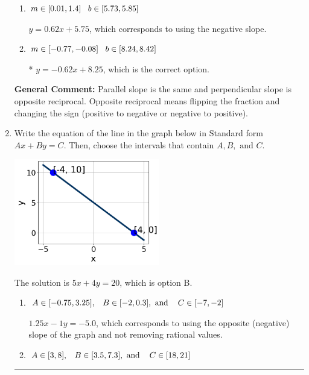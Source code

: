 \documentclass{extbook}[14pt]
\newcommand{\litem}[1]{\item #1

\rule{\textwidth}{0.4pt}}
\begin{document}
\begin{enumerate}
{\begin{enumerate}[label=\Alph*.]
 $y = -0.62x - 8.25$, which corresponds to using the correct slope and getting the negative $y$-intercept.
\item \( m \in [0.01, 1.4] \hspace*{3mm} b \in [5.73, 5.85] \)

 $y = 0.62x + 5.75$, which corresponds to using the negative slope.
\item \( m \in [-0.77, -0.08] \hspace*{3mm} b \in [8.24, 8.42] \)

* $y = -0.62x + 8.25$, which is the correct option.
\end{enumerate}

\textbf{General Comment:} Parallel slope is the same and perpendicular slope is opposite reciprocal. Opposite reciprocal means flipping the fraction and changing the sign (positive to negative or negative to positive).
}
\litem{
Write the equation of the line in the graph below in Standard form $Ax+By=C$. Then, choose the intervals that contain $A, B, \text{ and } C$.

\begin{center}
    \includegraphics[width=0.5\textwidth]{../Figures/linearGraphToStandardA.png}
\end{center}




The solution is \( 5x + 4y = 20 \), which is option B.\begin{enumerate}[label=\Alph*.]
\item \( A \in [-0.75, 3.25], \hspace{3mm} B \in [-2, 0.3], \text{ and } \hspace{3mm} C \in [-7, -2] \)

 $1.25x - 1y = -5.0$, which corresponds to using the opposite (negative) slope of the graph and not removing rational values.
\item \( A \in [3, 8], \hspace{3mm} B \in [3.5, 7.3], \text{ and } \hspace{3mm} C \in [18, 21] \)


\end{enumerate}}
\end{enumerate}
\end{document}
